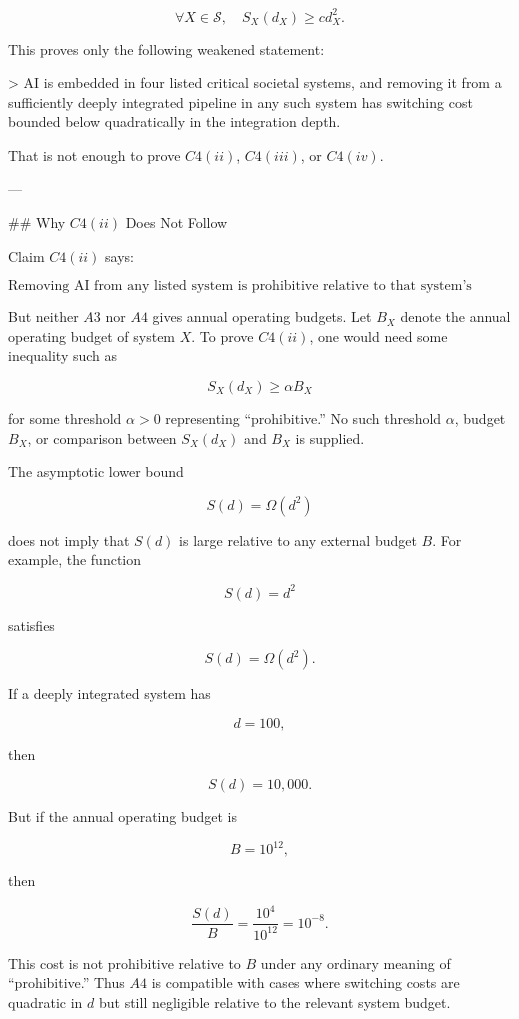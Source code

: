 \[
\forall X \in \mathcal{S}, \quad S_X(d_X) \ge c d_X^2.
\]

This proves only the following weakened statement:

> AI is embedded in four listed critical societal systems, and removing it from a sufficiently deeply integrated pipeline in any such system has switching cost bounded below quadratically in the integration depth.

That is not enough to prove \(C4(ii)\), \(C4(iii)\), or \(C4(iv)\).

---

## Why \(C4(ii)\) Does Not Follow

Claim \(C4(ii)\) says:

\[
\text{Removing AI from any listed system is prohibitive relative to that system's annual operating budget.}
\]

But neither \(A3\) nor \(A4\) gives annual operating budgets. Let \(B_X\) denote the annual operating budget of system \(X\). To prove \(C4(ii)\), one would need some inequality such as

\[
S_X(d_X) \ge \alpha B_X
\]

for some threshold \(\alpha>0\) representing “prohibitive.” No such threshold \(\alpha\), budget \(B_X\), or comparison between \(S_X(d_X)\) and \(B_X\) is supplied.

The asymptotic lower bound

\[
S(d)=\Omega(d^2)
\]

does not imply that \(S(d)\) is large relative to any external budget \(B\). For example, the function

\[
S(d)=d^2
\]

satisfies

\[
S(d)=\Omega(d^2).
\]

If a deeply integrated system has

\[
d=100,
\]

then

\[
S(d)=10{,}000.
\]

But if the annual operating budget is

\[
B=10^{12},
\]

then

\[
\frac{S(d)}{B}
=
\frac{10^4}{10^{12}}
=
10^{-8}.
\]

This cost is not prohibitive relative to \(B\) under any ordinary meaning of “prohibitive.” Thus \(A4\) is compatible with cases where switching costs are quadratic in \(d\) but still negligible relative to the relevant system budget.

